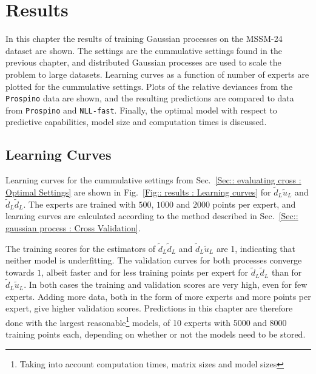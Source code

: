 \documentclass[twoside,english]{uiofysmaster}
\begin{document}
\tableofcontents

\chapter{Results}

In this chapter the results of training Gaussian processes on the MSSM-24 dataset are shown. The settings are the cummulative settings found in the previous chapter, and distributed Gaussian processes are used to scale the problem to large datasets. Learning curves as a function of number of experts are plotted for the cummulative settings. Plots of the relative deviances from the \verb|Prospino| data are shown, and the resulting predictions are compared to data from \verb|Prospino| and \verb|NLL-fast|. Finally, the optimal model with respect to predictive capabilities, model size and computation times is discussed.

\section{Learning Curves}

Learning curves for the cummulative settings from Sec.~\ref{Sec:: evaluating cross : Optimal Settings} are shown in Fig.~\ref{Fig:: results : Learning curves} for $\tilde{d}_L \tilde{u}_L$ and $\tilde{d}_L \tilde{d}_L$. The experts are trained with $500$, $1000$ and $2000$ points per expert, and learning curves are calculated according to the method described in Sec.~\ref{Sec:: gaussian process : Cross Validation}.

The training scores for the estimators of $\tilde{d}_L \tilde{d}_L$ and $\tilde{d}_L \tilde{u}_L$ are 1, indicating that neither model is underfitting. The validation curves for both processes converge towards $1$, albeit faster and for less training points per expert for $\tilde{d}_L \tilde{d}_L$ than for $\tilde{d}_L \tilde{u}_L$. In both cases the training and validation scores are very high, even for few experts. Adding more data, both in the form of more experts and more points per expert, give higher validation scores. Predictions in this chapter are therefore done with the largest reasonable\footnote{Taking into account computation times, matrix sizes and model sizes} models, of 10 experts with 5000 and 8000 training points each, depending on whether or not the models need to be stored.
\end{document}
